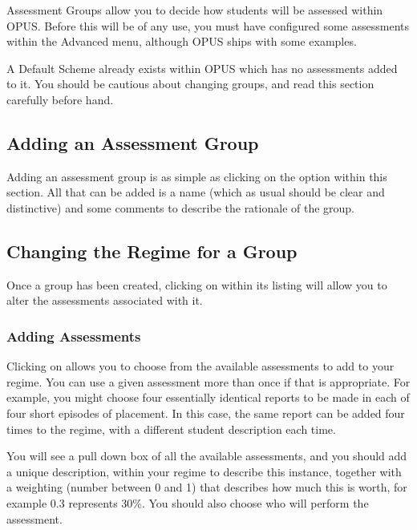 \documentclass[12 pt]{book}
\begin{document}
Assessment Groups allow you to decide how students will be assessed within
OPUS. Before this will be of any use, you must have configured some assessments
within the Advanced menu, although OPUS ships with some examples.

A Default Scheme already exists within OPUS which has no assessments added to
it. You should be cautious about changing groups, and read this section
carefully before hand.

\subsection{Adding an Assessment Group}

Adding an assessment group is as simple as clicking on the  option
within this section. All that can be added is a name (which as usual should be
clear and distinctive) and some comments to describe the rationale of the
group.

\subsection{Changing the Regime for a Group}

Once a group has been created, clicking on  within its listing
will allow you to alter the assessments associated with it.


\subsubsection{Adding Assessments}

Clicking on  allows you to choose from the available assessments to
add to your regime. You can use a given assessment more than once if that is
appropriate. For example, you might choose four essentially identical reports to
be made in each of four short episodes of placement. In this case, the same
report can be added four times to the regime, with a different student
description each time.

You will see a pull down box of all the available assessments, and you should
add a unique description, within your regime to describe this instance,
together with a weighting (number between 0 and 1) that describes how much this
is worth, for example 0.3 represents 30\%. You should also choose who will
perform the assessment.
\end{document}
